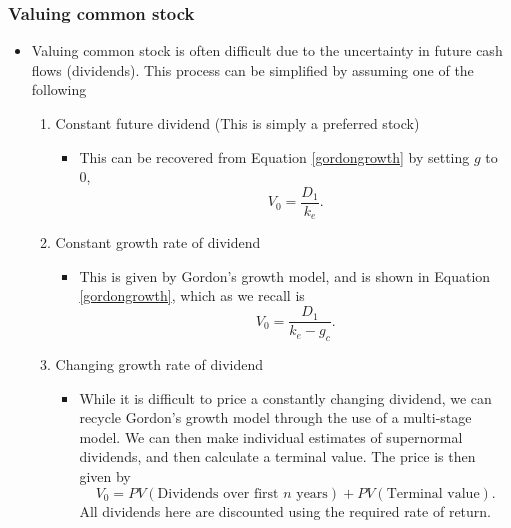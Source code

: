 \documentclass[../notes_compiled.tex]{subfiles}
\begin{document}
\subsubsection{Valuing common stock}
\begin{itemize}
\item Valuing common stock is often difficult due to the uncertainty in future cash flows (dividends). This process can be simplified by assuming one of the following
\begin{enumerate}
\item Constant future dividend (This is simply a preferred stock)
\begin{itemize}
\item This can be recovered from Equation \ref{gordongrowth} by setting $g$ to 0,
\begin{equation}
V_{0} = \frac{D_{1}}{k_{e}}.
\end{equation}
\end{itemize}
\item Constant growth rate of dividend
\begin{itemize}
\item This is given by Gordon’s growth model, and is shown in Equation \ref{gordongrowth}, which as we recall is
\begin{equation*}
V_{0} = \frac{D_{1}}{k_{e}-g_{c}}.
\end{equation*}
\end{itemize}
\item Changing growth rate of dividend
\begin{itemize}
\item While it is difficult to price a constantly changing dividend, we can recycle Gordon’s growth model through the use of a multi-stage model. We can then make individual estimates of supernormal dividends, and then calculate a terminal value. The price is then given by
\begin{equation}
V_{0} = PV(\text{Dividends over first $n$ years}) + PV(\text{Terminal value}).
\end{equation}
All dividends here are discounted using the required rate of return.
\end{itemize}
\end{enumerate}
\end{itemize}
\end{document}
